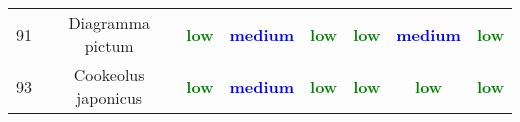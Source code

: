 \documentclass{report}\usepackage[]{graphicx}\usepackage[]{color}
\begin{document}
\begin{table}[ht]
{\begin{tabular}{cccccccc}
   91 & Diagramma pictum & \textcolor{green}{\textbf{low}} & \textcolor{blue}{\textbf{medium}} & \textcolor{green}{\textbf{low}} & \textcolor{green}{\textbf{low}} & \textcolor{blue}{\textbf{medium}} & \textcolor{green}{\textbf{low}} \\ 
   93 & Cookeolus japonicus & \textcolor{green}{\textbf{low}} & \textcolor{blue}{\textbf{medium}} & \textcolor{green}{\textbf{low}} & \textcolor{green}{\textbf{low}} & \textcolor{green}{\textbf{low}} & \textcolor{green}{\textbf{low}} \\ 
   \hline
\end{tabular}
}
\end{table}

\clearpage
\newpage

\setlength{\tabcolsep}{5pt}

\end{document}
